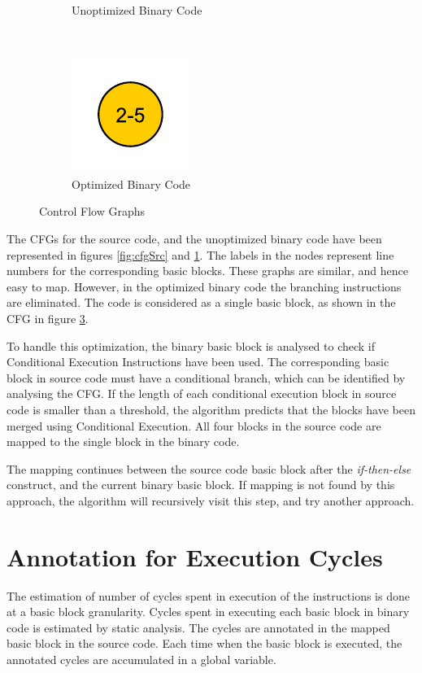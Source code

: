 \begin{figure}[h!]
\begin{subfigure}[t]{.33\textwidth}
\caption{Unoptimized Binary Code}
\label{fig:cfgUnopt}
\end{subfigure}%
~
\begin{subfigure}[t]{.33\textwidth}
\centering
\captionsetup{margin=10pt}
\includegraphics[width=.5\textwidth]{figures/CondExecObjOptFlowChart.pdf}
\caption{Optimized Binary Code}
\label{fig:cfgOpt}
\end{subfigure}
\caption{Control Flow Graphs}
\end{figure}

The CFGs for the source code, and the unoptimized binary code have been represented in figures \ref{fig:cfgSrc} and \ref{fig:cfgUnopt}. The labels in the nodes represent line numbers for the corresponding basic blocks. These graphs are similar, and hence easy to map. However, in the optimized binary code the branching instructions are eliminated. The code is considered as a single basic block, as shown in the CFG in figure \ref{fig:cfgOpt}.

To handle this optimization, the binary basic block is analysed to check if Conditional Execution Instructions have been used. The corresponding basic block in source code must have a conditional branch, which can be identified by analysing the CFG. If the length of each conditional execution block in source code is smaller than a threshold, the algorithm predicts that the blocks have been merged using Conditional Execution. All four blocks in the source code are mapped to the single block in the binary code.

The mapping continues between the source code basic block after the \emph{if-then-else} construct, and the current binary basic block. If mapping is not found by this approach, the algorithm will recursively visit this step, and try another approach. 

\section{Annotation for Execution Cycles}
The estimation of number of cycles spent in execution of the instructions is done at a basic block granularity. Cycles spent in executing each basic block in binary code is estimated by static analysis. The cycles are annotated in the mapped basic block in the source code. Each time when the basic block is executed, the annotated cycles are accumulated in a global variable.

